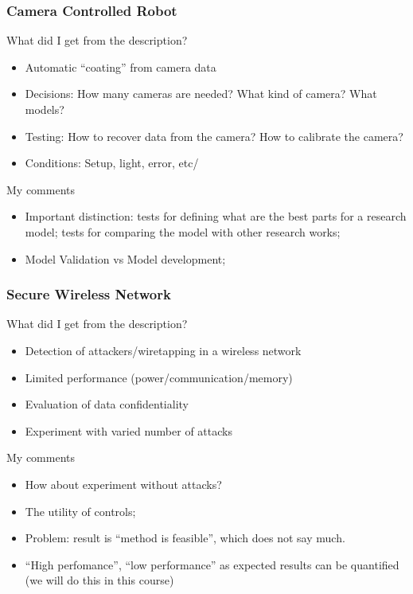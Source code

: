 \documentclass[10pt]{beamer}
\begin{document}
\begin{frame}
  \frametitle{Camera Controlled Robot}
  \begin{block}{What did I get from the description?}
    \begin{itemize}
    \item Automatic ``coating'' from camera data
    \item Decisions: How many cameras are needed? What kind of camera? What models?
    \item Testing: How to recover data from the camera? How to calibrate the camera?
    \item Conditions: Setup, light, error, etc/
    \end{itemize}
  \end{block}
  \begin{block}{My comments}
    \begin{itemize}
    \item Important distinction: tests for defining what are the best
      parts for a research model; tests for comparing the model with
      other research works;
    \item Model Validation vs Model development;
    \end{itemize}
  \end{block}
\end{frame}

\begin{frame}
  \frametitle{Secure Wireless Network}
  \begin{block}{What did I get from the description?}
    \begin{itemize}
    \item Detection of attackers/wiretapping in a wireless network
    \item Limited performance (power/communication/memory)
    \item Evaluation of data confidentiality
    \item Experiment with varied number of attacks
    \end{itemize}
  \end{block}
  \begin{block}{My comments}
    \begin{itemize}
    \item How about experiment without attacks? 
    \item The utility of controls;
    \item Problem: result is ``method is feasible'', which does not say much.
    \item ``High perfomance'', ``low performance'' as expected results
      can be quantified (we will do this in this course)
    \end{itemize}
  \end{block}
\end{frame}
\end{document}
